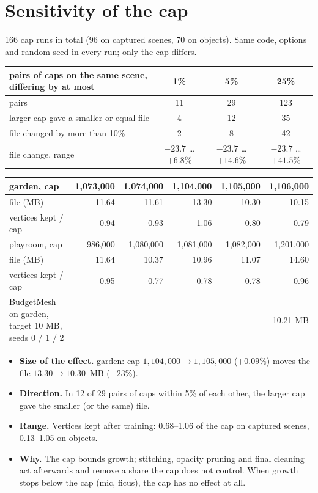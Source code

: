 \documentclass[10pt]{article}
\newcommand{\pct}{\%}
\begin{document}
\newpage
\section{Sensitivity of the cap}
166 cap runs in total (96 on captured scenes, 70 on objects). Same code, options and random seed in every run; only the cap differs.

\begin{table}[h!]\centering\small
\begin{tabular}{@{}lccc@{}}
\toprule
pairs of caps on the same scene, differing by at most & 1\pct & 5\pct & 25\pct \\
\midrule
pairs & 11 & 29 & 123 \\
larger cap gave a smaller or equal file & 4 & 12 & 35 \\
file changed by more than 10\pct & 2 & 8 & 42 \\
file change, range & $-23.7$ \ldots $+6.8\pct$ & $-23.7$ \ldots $+14.6\pct$ & $-23.7$ \ldots $+41.5\pct$ \\
\bottomrule
\end{tabular}
\end{table}
\vspace{-4pt}
\begin{table}[h!]\centering\small
\begin{tabular}{@{}lrrrrr@{}}
\toprule
garden, cap & 1,073,000 & 1,074,000 & 1,104,000 & 1,105,000 & 1,106,000 \\
\midrule
file (MB) & 11.64 & 11.61 & 13.30 & 10.30 & 10.15 \\
vertices kept / cap & 0.94 & 0.93 & 1.06 & 0.80 & 0.79 \\
\midrule
playroom, cap & 986,000 & 1,080,000 & 1,081,000 & 1,082,000 & 1,201,000 \\
\midrule
file (MB) & 11.64 & 10.37 & 10.96 & 11.07 & 14.60 \\
vertices kept / cap & 0.95 & 0.77 & 0.78 & 0.78 & 0.96 \\
\midrule
BudgetMesh on garden, target 10 MB, seeds 0 / 1 / 2 & \multicolumn{5}{r}{10.21 \quad 10.16 \quad 10.16 MB} \\
\bottomrule
\end{tabular}
\end{table}
\vspace{-4pt}
\begin{itemize}
\item \textbf{Size of the effect.} garden: cap $1{,}104{,}000 \rightarrow 1{,}105{,}000$ ($+0.09\pct$) moves the file $13.30 \rightarrow 10.30$~MB ($-23\pct$).
\item \textbf{Direction.} In 12 of 29 pairs of caps within 5\pct{} of each other, the larger cap gave the smaller (or the same) file.
\item \textbf{Range.} Vertices kept after training: 0.68--1.06 of the cap on captured scenes, 0.13--1.05 on objects.
\item \textbf{Why.} The cap bounds growth; stitching, opacity pruning and final cleaning act afterwards and remove a share the cap does not control. When growth stops below the cap (mic, ficus), the cap has no effect at all.
\end{itemize}
\end{document}
